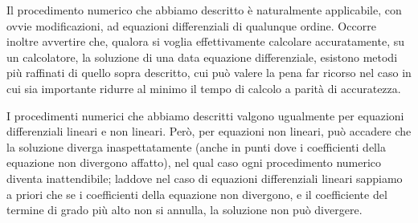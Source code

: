 \documentclass[11pt, a4paper]{book}
\numberwithin{equation}{section}
\begin{document}
Il procedimento numerico che abbiamo descritto è naturalmente applicabile, con
ovvie modificazioni, ad equazioni differenziali di qualunque ordine. Occorre
inoltre avvertire che, qualora si voglia effettivamente calcolare accuratamente,
su un calcolatore, la soluzione di una data equazione differenziale, esistono
metodi più raffinati di quello sopra descritto, cui può valere la pena far
ricorso nel caso in cui sia importante ridurre al minimo il tempo di calcolo a
parità di accuratezza.

I procedimenti numerici che abbiamo descritti valgono ugualmente per equazioni
differenziali lineari e non lineari. Però, per equazioni non lineari, può
accadere che la soluzione diverga inaspettatamente (anche in punti dove i
coefficienti della equazione non divergono affatto), nel qual caso ogni
procedimento numerico diventa inattendibile; laddove nel caso di equazioni
differenziali lineari sappiamo a priori che se i coefficienti della equazione
non divergono, e il coefficiente del termine di grado più alto non si annulla,
la soluzione non può divergere.
\end{document}

